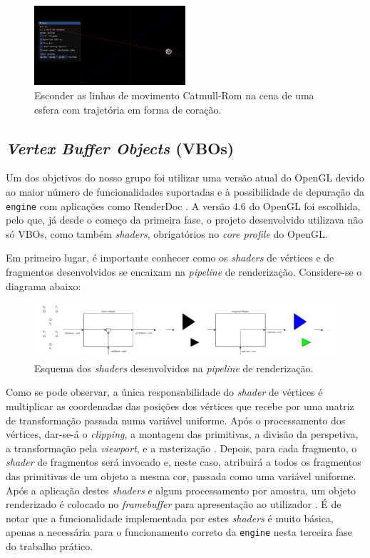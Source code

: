 \documentclass[12pt, a4paper]{article}
\begin{document}
\begin{figure}[H]
    \centering
    \includegraphics[width=0.5\textwidth]{res/phase3/HideCatmullRomMotionLines.png}
    \caption{Esconder as linhas de movimento Catmull-Rom na cena de
    uma esfera com trajetória em forma de coração.}
\end{figure}

\subsection{\emph{Vertex Buffer Objects} (VBOs)}

Um dos objetivos do nosso grupo foi utilizar uma versão atual do OpenGL devido ao maior número de
funcionalidades suportadas e à possibilidade de depuração da \texttt{engine} com aplicações como
RenderDoc \cite{renderdoc}. A versão 4.6 do OpenGL foi escolhida, pelo que, já desde o começo da
primeira fase, o projeto desenvolvido utilizava não só VBOs, como também \emph{shaders},
obrigatórios no \emph{core profile} do OpenGL.

Em primeiro lugar, é importante conhecer como os \emph{shaders} de vértices e de fragmentos
desenvolvidos se encaixam na \emph{pipeline} de renderização. Considere-se o diagrama abaixo:

\begin{figure}[H]
    \centering
    \includegraphics[width=\textwidth]{res/phase3/Shaders.pdf}
    \caption{Esquema dos \emph{shaders} desenvolvidos na \emph{pipeline} de renderização.}
\end{figure}

Como se pode observar, a única responsabilidade do \emph{shader} de vértices é multiplicar as
coordenadas das posições dos vértices que recebe por uma matriz de transformação passada numa
variável uniforme. Após o processamento dos vértices, dar-se-á o \emph{clipping}, a montagem das
primitivas, a divisão da perspetiva, a transformação pela \emph{viewport}, e a rasterização
\cite{vertex-post-processing}. Depois, para cada fragmento, o \emph{shader} de fragmentos será
invocado e, neste caso, atribuirá a todos os fragmentos das primitivas de um objeto a mesma cor,
passada como uma variável uniforme. Após a aplicação destes \emph{shaders} e algum processamento por
amostra, um objeto renderizado é colocado no \emph{framebuffer} para apresentação ao utilizador
\cite{per-sample-processing}. É de notar que a funcionalidade implementada por estes \emph{shaders}
é muito básica, apenas a necessária para o funcionamento correto da \texttt{engine} nesta terceira
fase do trabalho prático.
\end{document}
